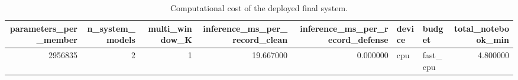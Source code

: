 \begin{table}[htbp]\centering\caption{Computational cost of the deployed final system.}\label{tab:runtime}
\begin{tabular}{rrrrrllr}
\toprule
parameters_per_member & n_system_models & multi_window_K & inference_ms_per_record_clean & inference_ms_per_record_defense & device & budget & total_notebook_min \\
\midrule
2956835 & 2 & 1 & 19.667000 & 0.000000 & cpu & fast_cpu & 4.800000 \\
\bottomrule
\end{tabular}
\end{table}
